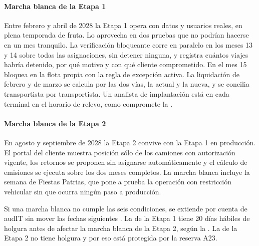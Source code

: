 \paragraph{Marcha blanca de la Etapa 1}
Entre febrero y abril de 2028 la Etapa 1 opera con datos y usuarios reales, en plena temporada de fruta.
Lo aprovecha en dos pruebas que no podrían hacerse en un mes tranquilo. La verificación bloqueante corre en
paralelo en los meses 13 y 14 sobre todas las asignaciones, sin detener ninguna, y registra cuántos viajes
habría detenido, por qué motivo y con qué cliente comprometido. En el mes 15 bloquea en la flota propia con
la regla de excepción activa. La liquidación de febrero y de marzo se calcula por las dos vías, la actual y
la nueva, y se concilia transportista por transportista. Un analista de implantación está en cada
terminal en el horario de relevo, como compromete la .

\paragraph{Marcha blanca de la Etapa 2}
En agosto y septiembre de 2028 la Etapa 2 convive con la Etapa 1 en producción. El portal del cliente
muestra posición sólo de los camiones con autorización vigente, los retornos se proponen sin asignarse
automáticamente y el cálculo de emisiones se ejecuta sobre los dos meses completos. La marcha blanca
incluye la semana de Fiestas Patrias, que pone a prueba la operación con restricción vehicular sin que
ocurra ningún paso a producción.

Si una marcha blanca no cumple las seis condiciones, se extiende por cuenta de audIT sin mover las fechas
siguientes . La de la Etapa 1 tiene 20 días hábiles de holgura antes de afectar la marcha
blanca de la Etapa 2, según la . La de la Etapa 2 no tiene holgura y por eso está
protegida por la reserva A23.
